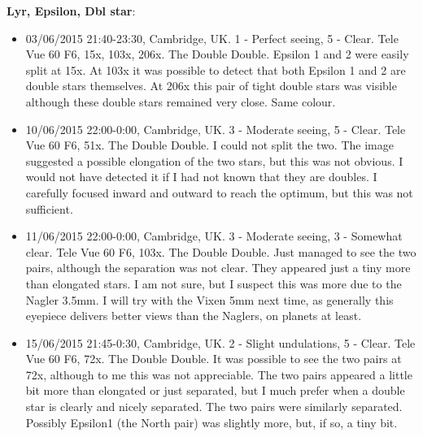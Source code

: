 {\bf Lyr, Epsilon, Dbl star}:
\begin{itemize}
\item 03/06/2015 21:40-23:30, Cambridge, UK. 1 - Perfect seeing, 5 - Clear. Tele Vue 60 F6, 15x, 103x, 206x. The Double Double. Epsilon 1 and 2 were easily split at 15x. At 103x it was possible to detect that both Epsilon 1 and 2 are double stars themselves. At 206x this pair of tight double stars was visible although these double stars remained very close. Same colour.
\item 10/06/2015 22:00-0:00, Cambridge, UK. 3 - Moderate seeing, 5 - Clear. Tele Vue 60 F6, 51x. The Double Double. I could not split the two. The image suggested a possible elongation of the two stars, but this was not obvious. I would not have detected it if I had not known that they are doubles. I carefully focused inward and outward to reach the optimum, but this was not sufficient. 
\item 11/06/2015 22:00-0:00, Cambridge, UK. 3 - Moderate seeing, 3 - Somewhat clear. Tele Vue 60 F6, 103x. The Double Double. Just managed to see the two pairs, although the separation was not clear. They appeared just a tiny more than elongated stars. I am not sure, but I suspect this was more due to the Nagler 3.5mm. I will try with the Vixen 5mm next time, as generally this eyepiece delivers better views than the Naglers, on planets at least.
\item 15/06/2015 21:45-0:30, Cambridge, UK. 2 - Slight undulations, 5 - Clear. Tele Vue 60 F6, 72x. The Double Double. It was possible to see the two pairs at 72x, although to me this was not appreciable. The two pairs appeared a little bit more than elongated or just separated, but I much prefer when a double star is clearly and nicely separated. The two pairs were similarly separated. Possibly Epsilon1 (the North pair) was slightly more, but, if so, a tiny bit.
\end{itemize}
